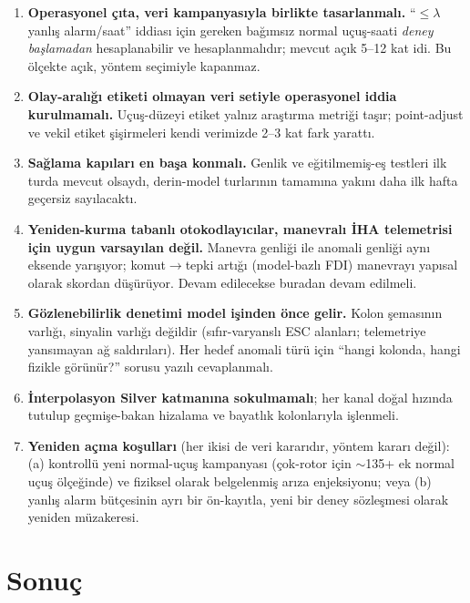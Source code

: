 \documentclass[11pt,a4paper]{article}
\begin{document}
\begin{enumerate}[itemsep=3pt]
  \item \textbf{Operasyonel çıta, veri kampanyasıyla birlikte tasarlanmalı.}
        ``$\leq \lambda$ yanlış alarm/saat'' iddiası için gereken bağımsız
        normal uçuş-saati \emph{deney başlamadan} hesaplanabilir ve
        hesaplanmalıdır; mevcut açık 5--12 kat idi. Bu ölçekte açık, yöntem
        seçimiyle kapanmaz.
  \item \textbf{Olay-aralığı etiketi olmayan veri setiyle operasyonel iddia
        kurulmamalı.} Uçuş-düzeyi etiket yalnız araştırma metriği taşır;
        point-adjust ve vekil etiket şişirmeleri kendi verimizde 2--3 kat
        fark yarattı.
  \item \textbf{Sağlama kapıları en başa konmalı.} Genlik ve eğitilmemiş-eş
        testleri ilk turda mevcut olsaydı, derin-model turlarının tamamına
        yakını daha ilk hafta geçersiz sayılacaktı.
  \item \textbf{Yeniden-kurma tabanlı otokodlayıcılar, manevralı İHA
        telemetrisi için uygun varsayılan değil.} Manevra genliği ile anomali
        genliği aynı eksende yarışıyor; komut$\to$tepki artığı (model-bazlı
        FDI) manevrayı yapısal olarak skordan düşürüyor. Devam edilecekse
        buradan devam edilmeli.
  \item \textbf{Gözlenebilirlik denetimi model işinden önce gelir.} Kolon
        şemasının varlığı, sinyalin varlığı değildir (sıfır-varyanslı ESC
        alanları; telemetriye yansımayan ağ saldırıları). Her hedef anomali
        türü için ``hangi kolonda, hangi fizikle görünür?'' sorusu yazılı
        cevaplanmalı.
  \item \textbf{İnterpolasyon Silver katmanına sokulmamalı}; her kanal doğal
        hızında tutulup geçmişe-bakan hizalama ve bayatlık kolonlarıyla
        işlenmeli.
  \item \textbf{Yeniden açma koşulları} (her ikisi de veri kararıdır, yöntem
        kararı değil): (a) kontrollü yeni normal-uçuş kampanyası (çok-rotor
        için $\sim$135+ ek normal uçuş ölçeğinde) ve fiziksel olarak
        belgelenmiş arıza enjeksiyonu; veya (b) yanlış alarm bütçesinin ayrı
        bir ön-kayıtla, yeni bir deney sözleşmesi olarak yeniden müzakeresi.
\end{enumerate}

\section{Sonuç}
\end{document}
